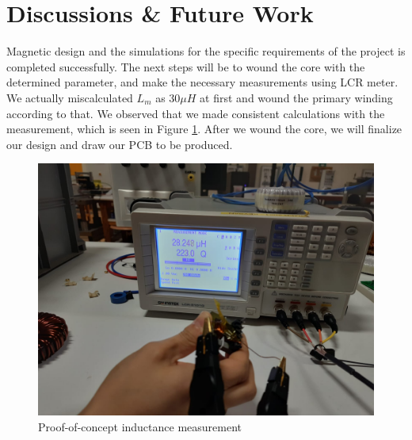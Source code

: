 \documentclass[12pt]{article}
\begin{document}
\section{Discussions  \& Future Work}
    Magnetic design and the simulations for the specific requirements of the project is completed successfully. The next steps will be to wound the core with the determined parameter, and make the necessary measurements using LCR meter. We actually miscalculated $L_m$ as $30 \mu H$ at first and wound the primary winding according to that. We observed that we made consistent calculations with the measurement, which is seen in Figure \ref{fig:experiment}. After we wound the core, we will finalize our design and draw our PCB to be produced.
    
    \begin{figure}[H]
        \centering
        \includegraphics[scale=0.3]{img/wounded_core.jpeg}
        \caption{Proof-of-concept inductance measurement}
        \label{fig:experiment}
    \end{figure}


\end{document}
